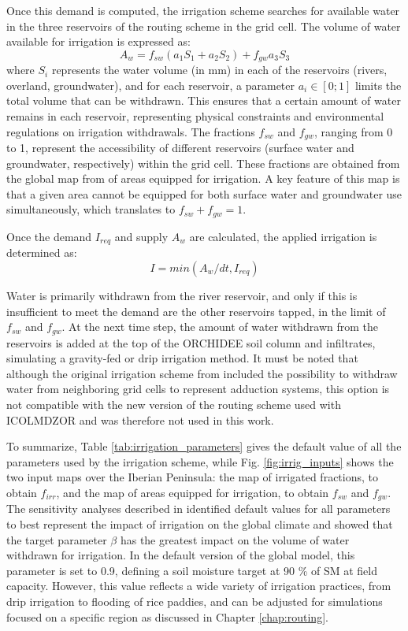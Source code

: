 Once this demand is computed, the irrigation scheme searches for available water in the three reservoirs of the routing scheme in the grid cell.
The volume of water available for irrigation is expressed as:
\begin{equation}
    A_w = f_{sw} (a_1 S_1 + a_2 S_2)+ f_{gw}a_3 S_3
\end{equation}
where $S_i$ represents the water volume (in mm) in each of the reservoirs (rivers, overland, groundwater), and for each reservoir, a parameter $a_i \in [0;1]$ limits the total volume that can be withdrawn. This ensures that a certain amount of water remains in each reservoir, representing physical constraints and environmental regulations on irrigation withdrawals.
The fractions $f_{sw}$ and $f_{gw}$, ranging from 0 to 1, represent the accessibility of different reservoirs (surface water and groundwater, respectively) within the grid cell. These fractions are obtained from the global map from \citet{siebert_groundwater_2010} of areas equipped for irrigation. A key feature of this map is that a given area cannot be equipped for both surface water and groundwater use simultaneously, which translates to $f_{sw} + f_{gw} =1$.

Once the demand $I_{req}$ and supply $A_w$ are calculated, the applied irrigation is determined as:
\begin{equation}
    I = min(A_w/dt, I_{req})
\end{equation}

Water is primarily withdrawn from the river reservoir, and only if this is insufficient to meet the demand are the other reservoirs tapped, in the limit of $f_{sw}$ and $f_{gw}$.
At the next time step, the amount of water withdrawn from the reservoirs is added at the top of the ORCHIDEE soil column and infiltrates, simulating a gravity-fed or drip irrigation method.
It must be noted that although the original irrigation scheme from \citet{arboleda-obando_validation_2024} included the possibility to withdraw water from neighboring grid cells to represent adduction systems, this option is not compatible with the new version of the routing scheme used with ICOLMDZOR and was therefore not used in this work.

To summarize, Table \ref{tab:irrigation_parameters} gives the default value of all the parameters used by the irrigation scheme, while Fig. \ref{fig:irrig_inputs} shows the two input maps over the Iberian Peninsula: the map of irrigated fractions, to obtain $f_{irr}$, and the map of areas equipped for irrigation, to obtain $f_{sw}$ and $f_{gw}$.
The sensitivity analyses described in \citet{arboleda-obando_validation_2024} identified default values for all parameters to best represent the impact of irrigation on the global climate and showed that the target parameter $\beta$ has the greatest impact on the volume of water withdrawn for irrigation.
In the default version of the global model, this parameter is set to 0.9, defining a soil moisture target at 90 \% of SM at field capacity. However, this value reflects a wide variety of irrigation practices, from drip irrigation to flooding of rice paddies, and can be adjusted for simulations focused on a specific region as discussed in Chapter \ref{chap:routing}.

